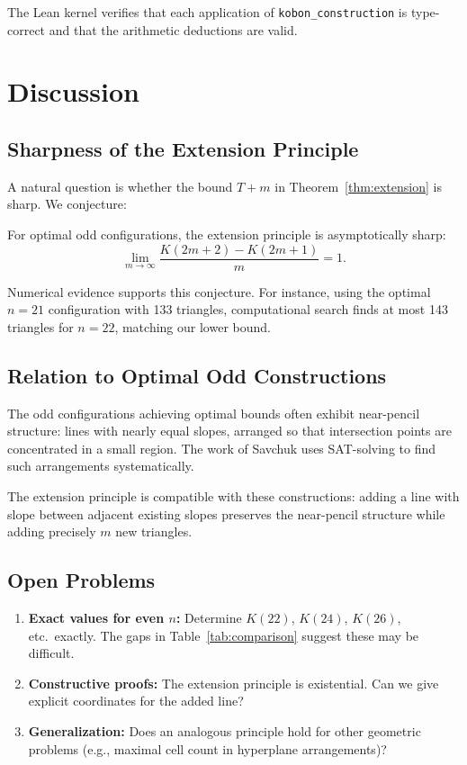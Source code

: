 \documentclass[11pt,a4paper]{article}
\theoremstyle{plain}
\theoremstyle{definition}
\theoremstyle{remark}
\newcommand{\K}{K}
\begin{document}
The Lean kernel verifies that each application of \texttt{kobon\_construction} is type-correct and that the arithmetic deductions are valid.

\section{Discussion}

\subsection{Sharpness of the Extension Principle}

A natural question is whether the bound $T + m$ in Theorem~\ref{thm:extension} is sharp. We conjecture:

\begin{conjecture}
For optimal odd configurations, the extension principle is asymptotically sharp:
\[
\lim_{m \to \infty} \frac{\K(2m+2) - \K(2m+1)}{m} = 1.
\]
\end{conjecture}

Numerical evidence supports this conjecture. For instance, using the optimal $n=21$ configuration with 133 triangles, computational search finds at most 143 triangles for $n=22$, matching our lower bound.

\subsection{Relation to Optimal Odd Constructions}

The odd configurations achieving optimal bounds often exhibit near-pencil structure: lines with nearly equal slopes, arranged so that intersection points are concentrated in a small region. The work of Savchuk \cite{savchuk2025} uses SAT-solving to find such arrangements systematically.

The extension principle is compatible with these constructions: adding a line with slope between adjacent existing slopes preserves the near-pencil structure while adding precisely $m$ new triangles.

\subsection{Open Problems}

\begin{enumerate}
\item \textbf{Exact values for even $n$:} Determine $\K(22)$, $\K(24)$, $\K(26)$, etc.\ exactly. The gaps in Table~\ref{tab:comparison} suggest these may be difficult.

\item \textbf{Constructive proofs:} The extension principle is existential. Can we give explicit coordinates for the added line?

\item \textbf{Generalization:} Does an analogous principle hold for other geometric problems (e.g., maximal cell count in hyperplane arrangements)?
\end{enumerate}
\end{document}
